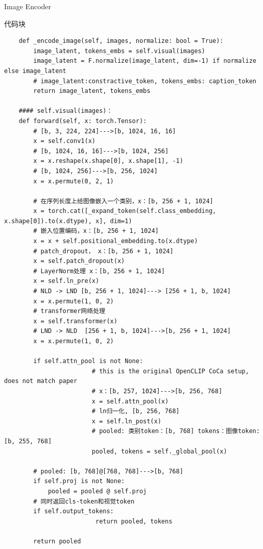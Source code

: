 \documentclass[zihao=false,fontset=windows]{ctexart}
\newcommand{\codehead}{{\small\ttfamily\color{feishuGray}代码块}\par\vspace{-0.15em}}
\begin{document}
\par\vspace{1.15em}\par\vspace{0.28em}
Image Encoder\par
\begin{feishucode}
\codehead
\begin{lstlisting}
    def _encode_image(self, images, normalize: bool = True):
        image_latent, tokens_embs = self.visual(images)
        image_latent = F.normalize(image_latent, dim=-1) if normalize else image_latent
        # image_latent:constractive_token, tokens_embs: caption_token
        return image_latent, tokens_embs
        
    #### self.visual(images)：
    def forward(self, x: torch.Tensor):
        # [b, 3, 224, 224]--->[b, 1024, 16, 16]
        x = self.conv1(x)
        # [b, 1024, 16, 16]--->[b, 1024, 256]
        x = x.reshape(x.shape[0], x.shape[1], -1)
        # [b, 1024, 256]--->[b, 256, 1024]
        x = x.permute(0, 2, 1)

        # 在序列长度上给图像嵌入一个类别，x：[b, 256 + 1, 1024]
        x = torch.cat([_expand_token(self.class_embedding, x.shape[0]).to(x.dtype), x], dim=1)
        # 嵌入位置编码，x：[b, 256 + 1, 1024]
        x = x + self.positional_embedding.to(x.dtype)
        # patch_dropout， x：[b, 256 + 1, 1024]
        x = self.patch_dropout(x)
        # LayerNorm处理 x：[b, 256 + 1, 1024]
        x = self.ln_pre(x)
        # NLD -> LND [b, 256 + 1, 1024]---> [256 + 1, b, 1024]
        x = x.permute(1, 0, 2)
        # transformer网络处理
        x = self.transformer(x)
        # LND -> NLD  [256 + 1, b, 1024]--->[b, 256 + 1, 1024]
        x = x.permute(1, 0, 2)

        if self.attn_pool is not None:
                        # this is the original OpenCLIP CoCa setup, does not match paper
                        # x：[b, 257, 1024]--->[b, 256, 768]
                        x = self.attn_pool(x)
                        # ln归一化, [b, 256, 768]
                        x = self.ln_post(x)
                        # pooled: 类别token：[b, 768] tokens：图像token:[b, 255, 768]
                        pooled, tokens = self._global_pool(x)

        # pooled: [b, 768]@[768, 768]--->[b, 768]
        if self.proj is not None:
            pooled = pooled @ self.proj
        # 同时返回cls-token和视觉token
        if self.output_tokens:
                         return pooled, tokens
        
        return pooled
\end{lstlisting}
\end{feishucode}
\end{document}
